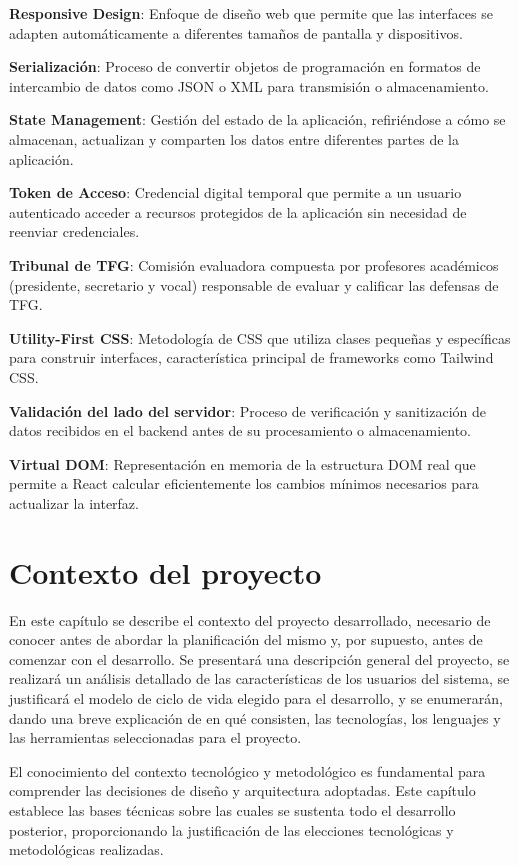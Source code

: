\documentclass[12pt,a4paper,oneside]{report}
\begin{document}
\textbf{Responsive Design}: Enfoque de diseño web que permite que las
interfaces se adapten automáticamente a diferentes tamaños de pantalla y
dispositivos.

\textbf{Serialización}: Proceso de convertir objetos de programación en
formatos de intercambio de datos como JSON o XML para transmisión o
almacenamiento.

\textbf{State Management}: Gestión del estado de la aplicación,
refiriéndose a cómo se almacenan, actualizan y comparten los datos entre
diferentes partes de la aplicación.

\textbf{Token de Acceso}: Credencial digital temporal que permite a un
usuario autenticado acceder a recursos protegidos de la aplicación sin
necesidad de reenviar credenciales.

\textbf{Tribunal de TFG}: Comisión evaluadora compuesta por profesores
académicos (presidente, secretario y vocal) responsable de evaluar y
calificar las defensas de TFG.

\textbf{Utility-First CSS}: Metodología de CSS que utiliza clases
pequeñas y específicas para construir interfaces, característica
principal de frameworks como Tailwind CSS.

\textbf{Validación del lado del servidor}: Proceso de verificación y
sanitización de datos recibidos en el backend antes de su procesamiento
o almacenamiento.

\textbf{Virtual DOM}: Representación en memoria de la estructura DOM
real que permite a React calcular eficientemente los cambios mínimos
necesarios para actualizar la interfaz.

\chapter{Contexto del proyecto}\label{contexto-del-proyecto}

En este capítulo se describe el contexto del proyecto desarrollado,
necesario de conocer antes de abordar la planificación del mismo y, por
supuesto, antes de comenzar con el desarrollo. Se presentará una
descripción general del proyecto, se realizará un análisis detallado de
las características de los usuarios del sistema, se justificará el
modelo de ciclo de vida elegido para el desarrollo, y se enumerarán,
dando una breve explicación de en qué consisten, las tecnologías, los
lenguajes y las herramientas seleccionadas para el proyecto.

El conocimiento del contexto tecnológico y metodológico es fundamental
para comprender las decisiones de diseño y arquitectura adoptadas. Este
capítulo establece las bases técnicas sobre las cuales se sustenta todo
el desarrollo posterior, proporcionando la justificación de las
elecciones tecnológicas y metodológicas realizadas.
\end{document}
